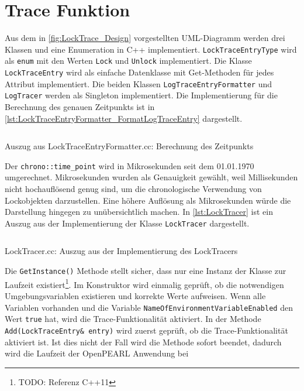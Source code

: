 \section{Trace Funktion}
\label{section:Implementierung:Trace Funktion}
Aus dem in \cref{fig:LockTrace_Design} vorgestellten UML-Diagramm werden drei
Klassen und eine Enumeration in C++ implementiert.
\texttt{Lock\-Trace\-Entry\-Type} wird als \texttt{enum} mit den Werten
\texttt{Lock} und \texttt{Unlock} implementiert. Die Klasse
\texttt{LockTraceEntry} wird als einfache Datenklasse mit Get-Methoden für jedes
Attribut implementiert. Die beiden Klassen \texttt{Log\-Trace\-Entry\-Formatter}
und \texttt{LogTracer} werden als Singleton implementiert. Die Implementierung
für die Berechnung des genauen Zeitpunkts ist in
\cref{lst:LockTraceEntryFormatter_FormatLogTraceEntry} dargestellt.
\begin{listing}[ht]
  \inputminted[frame=lines,linenos,firstline=31,lastline=33]{cpp}{./cpp/LockTraceEntryFormatter.cc}
  \caption{Auszug aus LockTraceEntryFormatter.cc: Berechnung des Zeitpunkts}
  \label{lst:LockTraceEntryFormatter_FormatLogTraceEntry}   
\end{listing}
Der \texttt{chrono::time\_point} wird in Mikrosekunden seit dem 01.01.1970
umgerechnet. Mikrosekunden wurden als Genauigkeit gewählt, weil Millisekunden
nicht hochauflösend genug sind, um die chronologische Verwendung von
Lockobjekten darzustellen. Eine höhere Auflösung als Mikrosekunden würde die
Darstellung hingegen zu unübersichtlich machen. In \cref{lst:LockTracer} ist ein
Auszug aus der Implementierung der Klasse \texttt{LockTracer} dargestellt.
\begin{listing}[ht]
  \inputminted[frame=lines,linenos,firstline=11,lastline=54]{cpp}{./cpp/LockTracer.cc}
  \caption{LockTracer.cc: Auszug aus der Implementierung des LockTracers}
  \label{lst:LockTracer}
\end{listing}
Die \texttt{GetInstance()} Methode stellt sicher, dass nur eine Instanz der
Klasse zur Laufzeit existiert\footnote{TODO: Referenz C++11}. Im Konstruktor
wird einmalig geprüft, ob die notwendigen Umgebungsvariablen existieren und
korrekte Werte aufweisen. Wenn alle Variablen vorhanden und die Variable
\texttt{Name\-Of\-Environment\-Variable\-Enabled} den Wert \texttt{true} hat,
wird die Trace-Funktionalität aktiviert. In der Methode
\texttt{Add(Lock\-Trace\-Entry\& entry)} wird zuerst geprüft, ob die
Trace-Funktionalität aktiviert ist. Ist dies nicht der Fall wird die Methode
sofort beendet, dadurch wird die Laufzeit der OpenPEARL Anwendung bei
